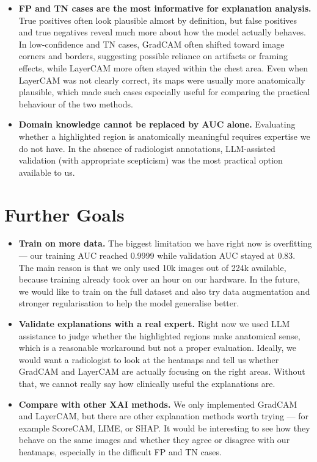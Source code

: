 \documentclass[12pt]{article}
\begin{document}
\begin{itemize}
    \item \textbf{FP and TN cases are the most informative for explanation analysis.}
    True positives often look plausible almost by definition, but false positives and true negatives reveal much more about how the model actually behaves. In low-confidence and TN cases, GradCAM often shifted toward image corners and borders, suggesting possible reliance on artifacts or framing effects, while LayerCAM more often stayed within the chest area. Even when LayerCAM was not clearly correct, its maps were usually more anatomically plausible, which made such cases especially useful for comparing the practical behaviour of the two methods.

    \item \textbf{Domain knowledge cannot be replaced by AUC alone.}
    Evaluating whether a highlighted region is anatomically meaningful requires expertise we do not have.
    In the absence of radiologist annotations, LLM-assisted validation (with appropriate scepticism) was the most practical option available to us.
\end{itemize}

\section{Further Goals}

\begin{itemize}
    \item \textbf{Train on more data.}
    The biggest limitation we have right now is overfitting --- our training AUC reached 0.9999 while validation AUC stayed at 0.83. The main reason is that we only used 10k images out of 224k available, because training already took over an hour on our hardware. In the future, we would like to train on the full dataset and also try data augmentation and stronger regularisation to help the model generalise better.

    \item \textbf{Validate explanations with a real expert.}
    Right now we used LLM assistance to judge whether the highlighted regions make anatomical sense, which is a reasonable workaround but not a proper evaluation. Ideally, we would want a radiologist to look at the heatmaps and tell us whether GradCAM and LayerCAM are actually focusing on the right areas. Without that, we cannot really say how clinically useful the explanations are.

    \item \textbf{Compare with other XAI methods.}
    We only implemented GradCAM and LayerCAM, but there are other explanation methods worth trying --- for example ScoreCAM, LIME, or SHAP. It would be interesting to see how they behave on the same images and whether they agree or disagree with our heatmaps, especially in the difficult FP and TN cases.
\end{itemize}
\end{document}
